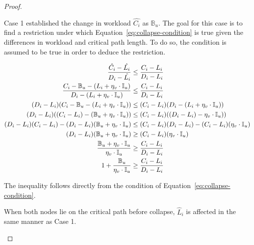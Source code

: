 \begin{theorem}
\begin{proof}
\begin{case}
      Case 1 established the change in workload
      ${\hat{C_i}}$ as ${\mathbb{B}_u}$. The goal for this
      case is to find a restriction under which
      Equation~\ref{eq:collapse-condition} is true given the
      differences in workload and critical path length. To do so, the
      condition is assumed to be true in order to deduce the restriction.

      \begin{align*}
        \indent
        \frac{\hat{C_i} - \hat{L_i}} 
             {D_i - \hat{L_i}} &\le
        \frac{C_i - L_i}
             {D_i - L_i} \\
        \frac{C_i - \mathbb{B}_u - (L_i + \eta_v
          \cdot \mathbb{I}_u)} 
             {D_i - (L_i + \eta_v
          \cdot \mathbb{I}_u)} &\le
        \frac{C_i - L_i}
             {D_i - L_i} \\
        (D_i - L_i)(C_i - \mathbb{B}_u - (L_i + \eta_v \cdot \mathbb{I}_u))
             &\le
             (C_i - L_i)(D_i - (L_i + \eta_v \cdot \mathbb{I}_u)) \\
        (D_i - L_i)((C_i - L_i) - (\mathbb{B}_u + \eta_v \cdot \mathbb{I}_u))
             &\le
             (C_i - L_i)((D_i - L_i) - \eta_v \cdot \mathbb{I}_u)) \\
        (D_i - L_i)(C_i - L_i) -
             (D_i - L_i)(\mathbb{B}_u + \eta_v \cdot \mathbb{I}_u)
             &\le
             (C_i - L_i)(D_i - L_i) - (C_i - L_i)(\eta_v \cdot \mathbb{I}_u) \\
        (D_i - L_i)(\mathbb{B}_u + \eta_v \cdot \mathbb{I}_u)
             &\ge
             (C_i - L_i)(\eta_v \cdot \mathbb{I}_u) \\
        \frac{\mathbb{B}_u + \eta_v \cdot \mathbb{I}_u}
             {\eta_v \cdot \mathbb{I}_u}
             &\ge
             \frac{C_i - L_i}{D_i - L_i} \\
        1 + \frac{\mathbb{B}_u}
             {\eta_v \cdot \mathbb{I}_u}
             &\ge
             \frac{C_i - L_i}{D_i - L_i}
      \end{align*}

      The inequality follows directly from the condition of
      Equation~\ref{eq:collapse-condition}.
    \end{case}

    \begin{case}
      When both nodes lie on the critical path before collapse,
      ${\hat{L}_i}$ is affected in the same manner as Case 1.


\end{case}
\end{proof}
\end{theorem}
